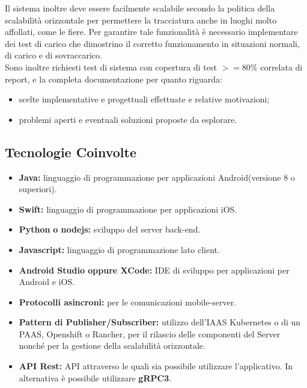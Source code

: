	Il sistema inoltre deve essere facilmente scalabile secondo la politica della scalabilità orizzontale per permettere la tracciatura anche in luoghi molto affollati, come le fiere. Per garantire tale funzionalità è necessario implementare dei test di carico che dimostrino il corretto funzionamento in situazioni normali, di carico e di sovraccarico.\\
	Sono inoltre richiesti test di sistema con copertura di test $>=80\%$ correlata di report, e la completa documentazione per quanto riguarda:
	\begin{itemize}
		\item scelte implementative e progettuali effettuate e relative motivazioni;
		\item problemi aperti e eventuali soluzioni proposte da esplorare. 
	\end{itemize}
	\subsection{Tecnologie Coinvolte}
	\begin{itemize}
		\item \textbf{Java}\textbf{:} linguaggio di programmazione per applicazioni Android(versione 8 o superiori).
		\item \textbf{Swift}\textbf{:} linguaggio di programmazione per applicazioni iOS.
		\item \textbf{Python} \textbf{o nodejs}\textbf{:} sviluppo del server back-end.
		\item \textbf{Javascript}\textbf{:} linguaggio di programmazione lato client.
		\item \textbf{Android Studio oppure XCode:} IDE di sviluppo per applicazioni per Android e iOS.
		\item \textbf{Protocolli asincroni:} per le comunicazioni mobile-server.
		\item \textbf{Pattern di Publisher/Subscriber:} utilizzo dell’IAAS Kubernetes o di un PAAS, Openshift o Rancher, per il rilascio delle componenti del Server nonché per la gestione della scalabilità orizzontale.
		\item \textbf{API Rest}\textbf{:} API attraverso le quali sia possibile utilizzare l'applicativo. In alternativa è possibile utilizzare \textbf{gRPC3}.
	\end{itemize}
	
